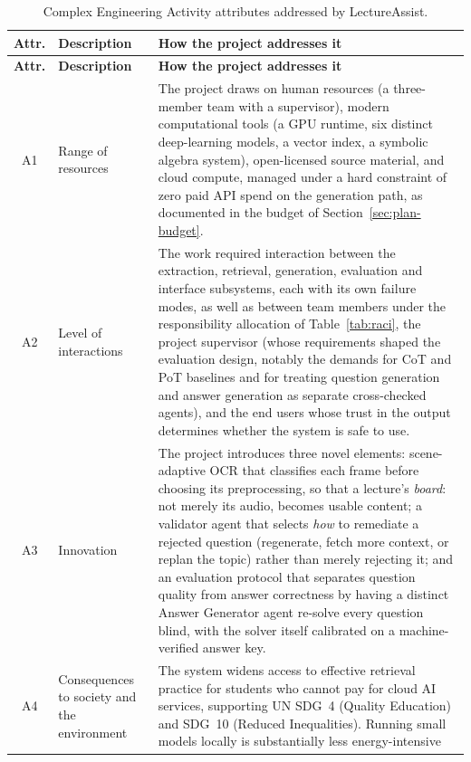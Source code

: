 {\footnotesize\singlespacing
\begin{longtable}{|c|p{3.4cm}|p{8.4cm}|}
\caption{Complex Engineering Activity attributes addressed by LectureAssist.}
\label{tab:cea}\\
\hline
\textbf{Attr.} & \textbf{Description} & \textbf{How the project addresses it} \\
\hline
\endfirsthead
\hline
\textbf{Attr.} & \textbf{Description} & \textbf{How the project addresses it} \\
\hline
\endhead
\hline
\endfoot
\hline
\endlastfoot

A1 & Range of resources &
The project draws on human resources (a three-member team with a supervisor), modern
computational tools (a GPU runtime, six distinct deep-learning models, a vector
index, a symbolic algebra system), open-licensed source material, and cloud compute, managed under a hard constraint of zero paid API spend on the generation path,
as documented in the budget of Section~\ref{sec:plan-budget}. \\
\hline
A2 & Level of interactions &
The work required interaction between the extraction, retrieval, generation,
evaluation and interface subsystems, each with its own failure modes, as well as
between team members under the responsibility allocation of
Table~\ref{tab:raci}, the project supervisor (whose requirements shaped the
evaluation design, notably the demands for CoT and PoT baselines and for treating
question generation and answer generation as separate cross-checked agents), and the
end users whose trust in the output determines whether the system is safe to use. \\
\hline
A3 & Innovation &
The project introduces three novel elements: scene-adaptive OCR that classifies each
frame before choosing its preprocessing, so that a lecture's \emph{board}: not
merely its audio, becomes usable content; a validator agent that selects
\emph{how} to remediate a rejected question (regenerate, fetch more context, or
replan the topic) rather than merely rejecting it; and an evaluation protocol that
separates question quality from answer correctness by having a distinct Answer
Generator agent re-solve every question blind, with the solver itself calibrated on a
machine-verified answer key. \\
\hline
A4 & Consequences to society and the environment &
The system widens access to effective retrieval practice for students who cannot pay
for cloud AI services, supporting UN SDG~4 (Quality Education) and SDG~10 (Reduced
Inequalities). Running small models locally is substantially less energy-intensive

\end{longtable}}
